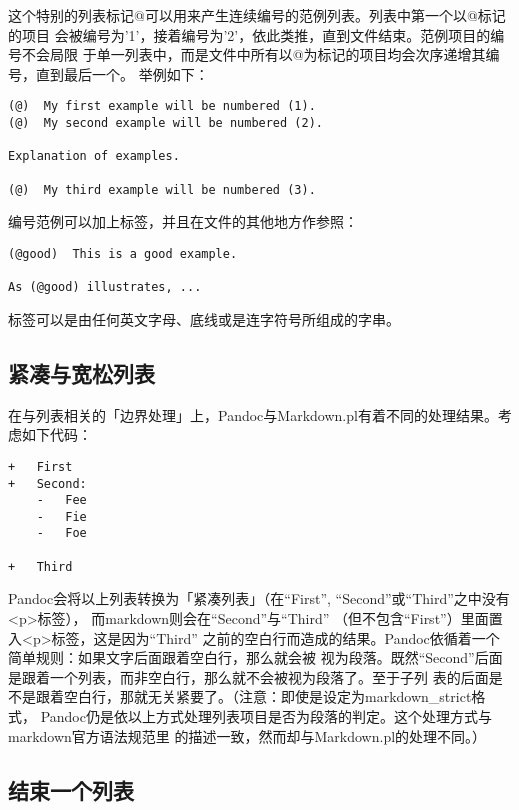 \documentclass[cn]{elegantbook}
\begin{document}
这个特别的列表标记@可以用来产生连续编号的范例列表。列表中第一个以@标记的项目
会被编号为'1'，接着编号为'2'，依此类推，直到文件结束。范例项目的编号不会局限
于单一列表中，而是文件中所有以@为标记的项目均会次序递增其编号，直到最后一个。
举例如下：

\begin{lstlisting}
(@)  My first example will be numbered (1).
(@)  My second example will be numbered (2).

Explanation of examples.

(@)  My third example will be numbered (3).
\end{lstlisting}

编号范例可以加上标签，并且在文件的其他地方作参照：

\begin{lstlisting}
(@good)  This is a good example.

As (@good) illustrates, ...
\end{lstlisting}

标签可以是由任何英文字母、底线或是连字符号所组成的字串。

\hypertarget{ux7d27ux51d1ux4e0eux5bbdux677eux5217ux8868}{%
\subsection{紧凑与宽松列表}\label{ux7d27ux51d1ux4e0eux5bbdux677eux5217ux8868}}

在与列表相关的「边界处理」上，Pandoc与Markdown.pl有着不同的处理结果。考虑如下代码：

\begin{lstlisting}
+   First
+   Second:
    -   Fee
    -   Fie
    -   Foe

+   Third
\end{lstlisting}

Pandoc会将以上列表转换为「紧凑列表」（在``First'',
``Second''或``Third''之中没有\textless p\textgreater 标签），
而markdown则会在``Second''与``Third''
（但不包含``First''）里面置入\textless p\textgreater 标签，这是因为``Third''
之前的空白行而造成的结果。Pandoc依循着一个简单规则：如果文字后面跟着空白行，那么就会被
视为段落。既然``Second''后面是跟着一个列表，而非空白行，那么就不会被视为段落了。至于子列
表的后面是不是跟着空白行，那就无关紧要了。（注意：即使是设定为markdown\_strict格式，
Pandoc仍是依以上方式处理列表项目是否为段落的判定。这个处理方式与markdown官方语法规范里
的描述一致，然而却与Markdown.pl的处理不同。）

\hypertarget{ux7ed3ux675fux4e00ux4e2aux5217ux8868}{%
\subsection{结束一个列表}\label{ux7ed3ux675fux4e00ux4e2aux5217ux8868}}
\end{document}
